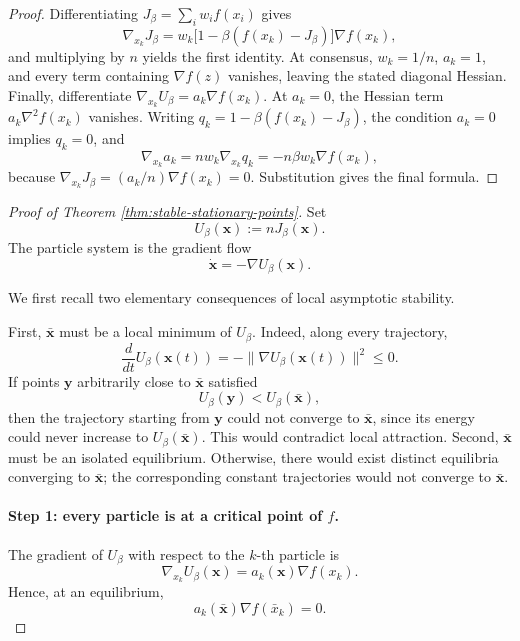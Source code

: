 \documentclass{article}
\theoremstyle{plain}
\theoremstyle{definition}
\theoremstyle{remark}
\begin{document}
\begin{proof}
Differentiating \(J_\beta=\sum_i w_i f(x_i)\) gives
\[
 \nabla_{x_k}J_\beta
 =w_k\bigl[1-\beta(f(x_k)-J_\beta)\bigr]\nabla f(x_k),
\]
and multiplying by \(n\) yields the first identity.  At consensus, \(w_k=1/n\), \(a_k=1\), and every term containing \(\nabla f(z)\) vanishes, leaving the stated diagonal Hessian.  Finally, differentiate \(\nabla_{x_k}U_\beta=a_k\nabla f(x_k)\).  At \(a_k=0\), the Hessian term \(a_k\nabla^2f(x_k)\) vanishes.  Writing \(q_k=1-\beta(f(x_k)-J_\beta)\), the condition \(a_k=0\) implies \(q_k=0\), and
\[
 \nabla_{x_k}a_k=nw_k\nabla_{x_k}q_k
 =-n\beta w_k\nabla f(x_k),
\]
because \(\nabla_{x_k}J_\beta=(a_k/n)\nabla f(x_k)=0\).  Substitution gives the final formula.
\end{proof}

\begin{proof}[Proof of Theorem \ref{thm:stable-stationary-points}]

Set
\[
    U_\beta(\mathbf x):=nJ_\beta(\mathbf x).
\]
The particle system is the gradient flow
\[
    \dot{\mathbf x}=-\nabla U_\beta(\mathbf x).
\]

We first recall two elementary consequences of local asymptotic stability.

First, \(\bar{\mathbf x}\) must be a local minimum of \(U_\beta\). Indeed, along every trajectory,
\[
    \frac{d}{dt}U_\beta(\mathbf x(t)) = -\|\nabla U_\beta(\mathbf x(t))\|^2 \leq 0.
\]
If points \(\mathbf y\) arbitrarily close to \(\bar{\mathbf x}\) satisfied
\[
    U_\beta(\mathbf y)<U_\beta(\bar{\mathbf x}),
\]
then the trajectory starting from \(\mathbf y\) could not converge to \(\bar{\mathbf x}\), since its energy could never increase to \(U_\beta(\bar{\mathbf x})\). This would contradict local attraction. Second, \(\bar{\mathbf x}\) must be an isolated equilibrium. Otherwise, there would exist distinct equilibria converging to \(\bar{\mathbf x}\); the corresponding constant trajectories would not converge to \(\bar{\mathbf x}\).

\paragraph{Step 1: every particle is at a critical point of \(f\).}

The gradient of \(U_\beta\) with respect to the \(k\)-th particle is
\[
    \nabla_{x_k}U_\beta(\mathbf x) = a_k(\mathbf x)\nabla f(x_k).
\]
Hence, at an equilibrium,
\[
    a_k(\bar{\mathbf x})\nabla f(\bar x_k)=0.
\]


\end{proof}
\end{document}
